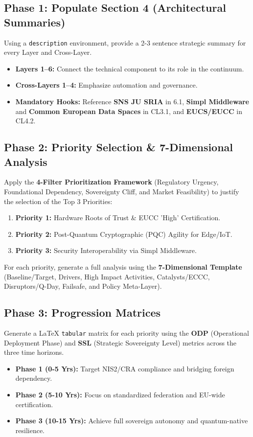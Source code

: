 \documentclass{ieeeaccess}
\begin{document}
\subsection*{Phase 1: Populate Section 4 (Architectural Summaries)}
Using a \texttt{description} environment, provide a 2-3 sentence strategic summary for every Layer and Cross-Layer. 
\begin{itemize}
    \item \textbf{Layers 1--6:} Connect the technical component to its role in the continuum.
    \item \textbf{Cross-Layers 1--4:} Emphasize automation and governance.
    \item \textbf{Mandatory Hooks:} Reference \textbf{SNS JU SRIA} in 6.1, \textbf{Simpl Middleware} and \textbf{Common European Data Spaces} in CL3.1, and \textbf{EUCS/EUCC} in CL4.2.
\end{itemize}

\subsection*{Phase 2: Priority Selection \& 7-Dimensional Analysis}
Apply the \textbf{4-Filter Prioritization Framework} (Regulatory Urgency, Foundational Dependency, Sovereignty Cliff, and Market Feasibility) to justify the selection of the Top 3 Priorities:
\begin{enumerate}
    \item \textbf{Priority 1:} Hardware Roots of Trust \& EUCC 'High' Certification.
    \item \textbf{Priority 2:} Post-Quantum Cryptographic (PQC) Agility for Edge/IoT.
    \item \textbf{Priority 3:} Security Interoperability via Simpl Middleware.
\end{enumerate}
For each priority, generate a full analysis using the \textbf{7-Dimensional Template} (Baseline/Target, Drivers, High Impact Activities, Catalysts/ECCC, Disruptors/Q-Day, Failsafe, and Policy Meta-Layer).

\subsection*{Phase 3: Progression Matrices}
Generate a LaTeX \texttt{tabular} matrix for each priority using the \textbf{ODP} (Operational Deployment Phase) and \textbf{SSL} (Strategic Sovereignty Level) metrics across the three time horizons.
\begin{itemize}
    \item \textbf{Phase 1 (0-5 Yrs):} Target NIS2/CRA compliance and bridging foreign dependency.
    \item \textbf{Phase 2 (5-10 Yrs):} Focus on standardized federation and EU-wide certification.
    \item \textbf{Phase 3 (10-15 Yrs):} Achieve full sovereign autonomy and quantum-native resilience.
\end{itemize}
\end{document}
